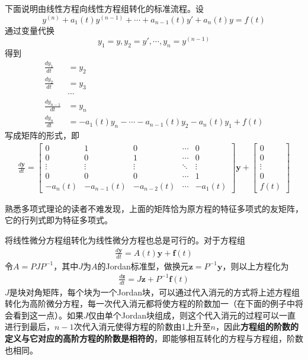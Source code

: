 下面说明由线性方程向线性方程组转化的标准流程。设
\[y^{(n)}+a_{1}(t)y^{(n-1)}+\cdots +a_{n-1}(t)y'+a_n(t)y=f(t)\]
通过变量代换
\[y_1=y,y_2=y',\cdots,y_n=y^{(n-1)}\]
得到\begin{align*}
        \frac{dy_1}{dt}&=y_2\\
        \frac{dy_2}{dt}&=y_3\\
        &\cdots\\
        \frac{dy_{n-1}}{dt}&=y_n\\
        \frac{dy_n}{dt}&=-a_{1}(t)y_{n}-\cdots -a_{n-1}(t)y_2-a_n(t)y_1+f(t)
\end{align*}
写成矩阵的形式，即\begin{align*}
    \frac{d\mathbf{y}}{dt}=\begin{bmatrix}
    0 & 1 & 0 & \cdots & 0\\
    0 & 0 & 1 & \cdots & 0\\
    \vdots & \vdots & \vdots & \ddots & \vdots\\
    0 & 0 & 0 & \cdots & 1\\
    -a_n(t) & -a_{n-1}(t) & -a_{n-2}(t) & \cdots & -a_1(t)
    \end{bmatrix}\mathbf{y}+\begin{bmatrix}
    0\\
    0\\
    \vdots\\
    0\\
    f(t)
    \end{bmatrix}
\end{align*}

熟悉多项式理论的读者不难发现，上面的矩阵恰为原方程的特征多项式的友矩阵，它的行列式即为特征多项式。

将线性微分方程组转化为线性微分方程也总是可行的。对于方程组\begin{align*}
    \frac{d\mathbf{y}}{dt}=A(t)\mathbf{y}+\mathbf{f}(t)
\end{align*}
令$A=PJP^{-1}$，其中$J$为$A$的Jordan标准型，做换元$\mathbf{z}=P^{-1}\mathbf{y}$，则以上方程化为\begin{align*}
    \frac{d\mathbf{z}}{dt}=J\mathbf{z}+P^{-1}\mathbf{f}(t)
\end{align*}
$J$是块对角矩阵，每个块为一个Jordan块，可以通过代入消元的方式将上述方程组转化为高阶微分方程，每一次代入消元都将使方程的阶数加一（在下面的例子中将会看到这一点）。如果$J$仅由单个Jordan块组成，则这个代入消元的过程可以一直进行到最后，$n-1$次代入消元使得方程的阶数由1上升至$n$，因此\textbf{方程组的阶数的定义与它对应的高阶方程的阶数是相符的}，即能够相互转化的方程与方程组，阶数也相同。

